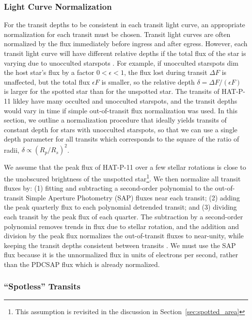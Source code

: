 \subsubsection{Light Curve Normalization} \label{sec:norm}

For the transit depths to be consistent in each transit light curve, an appropriate normalization for each transit must be chosen. Transit light curves are often normalized by the flux immediately before ingress and after egress. However, each transit light curve will have different relative depths if the total flux of the star is varying due to unocculted starspots \citep{Czesla2009, Carter2011, Csizmadia2013}. For example, if unocculted starspots dim the host star's flux by a factor $0 < \epsilon < 1$, the flux lost during transit $\Delta F$ is unaffected, but the total flux $\epsilon F$ is smaller, so the relative depth $\delta = \Delta F / (\epsilon F)$ is larger for the spotted star than for the unspotted star. The transits of HAT-P-11 likley have many occulted and unocculted starspots, and the transit depths would vary in time if simple out-of-transit flux normalization was used. In this section, we outline a normalization procedure that ideally yields transits of constant depth for stars with unocculted starspots, so that we can use a single depth parameter for all transits which corresponds to the square of the ratio of radii, $\delta \propto (R_p/R_s)^2$.

We assume that the peak flux of HAT-P-11 over a few stellar rotations is close to the unobscured brightness of the unspotted star\footnote{This assumption is revisited in the discussion in Section~\ref{sec:spotted_area}}. We then normalize all transit fluxes by: (1) fitting and subtracting a second-order polynomial to the out-of-transit Simple Aperture Photometry (SAP) fluxes near each transit; (2) adding the peak quarterly flux to each polynomial detrended transit; and (3) dividing each transit by the peak flux of each quarter. The subtraction by a second-order polynomial removes trends in flux due to stellar rotation, and the addition and division by the peak flux normalizes the out-of-transit fluxes to near-unity, while keeping the transit depths consistent between transits \citep{Hebb2017}. We must use the SAP flux because it is the unnormalized flux in units of electrons per second, rather than the PDCSAP flux which is already normalized.

\subsubsection{``Spotless'' Transits} \label{sec:spotless}

